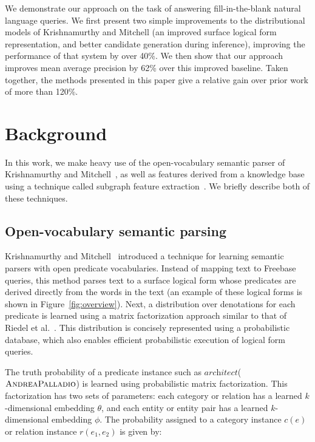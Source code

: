\documentclass[11pt]{article}
\newcommand{\figref}[1]{Figure~\ref{fig:#1}}
\newcommand{\lexicalpredicate}[1]{\ensuremath{\textit{#1}}}
\newcommand{\entity}[1]{\ensuremath{\textsc{#1}}}
\begin{document}
We demonstrate our approach on the task of answering fill-in-the-blank
natural language queries.  We first present two simple improvements to
the distributional models of Krishnamurthy and Mitchell (an improved
surface logical form representation, and better candidate generation
during inference), improving the performance of that system by over
40\%.  We then show that our approach improves mean average precision
by 62\% over this improved baseline.  Taken together, the methods
presented in this paper give a relative gain over prior work of more
than 120\%.

\section{Background}
\label{sec:background}

In this work, we make heavy use of the open-vocabulary semantic parser
of Krishnamurthy and
Mitchell~, as
well as features derived from a knowledge base using a technique
called subgraph feature extraction~\cite{gardner-2015-sfe}.  We
briefly describe both of these techniques.

\subsection{Open-vocabulary semantic parsing}
\label{sec:jayant-semparse}

Krishnamurthy and
Mitchell~
introduced a technique for learning semantic parsers with open
predicate vocabularies. Instead of mapping text to Freebase queries,
this method parses text to a surface logical form whose predicates are
derived directly from the words in the text (an example of these
logical forms is shown in \figref{overview}). Next, a distribution
over denotations for each predicate is learned using a matrix
factorization approach similar to that of Riedel et
al.~. This distribution is
concisely represented using a probabilistic database, which also
enables efficient probabilistic execution of logical form queries.

The truth probability of a predicate instance such as
\lexicalpredicate{architect}(\entity{AndreaPalladio}) is learned using
probabilistic matrix factorization. This factorization has two sets of
parameters: each category or relation has a learned $k$-dimensional
embedding $\theta$, and each entity or entity pair has a learned
$k$-dimensional embedding $\phi$. The probability assigned to a
category instance $c(e)$ or relation instance $r(e_1, e_2)$ is given
by:
\end{document}
